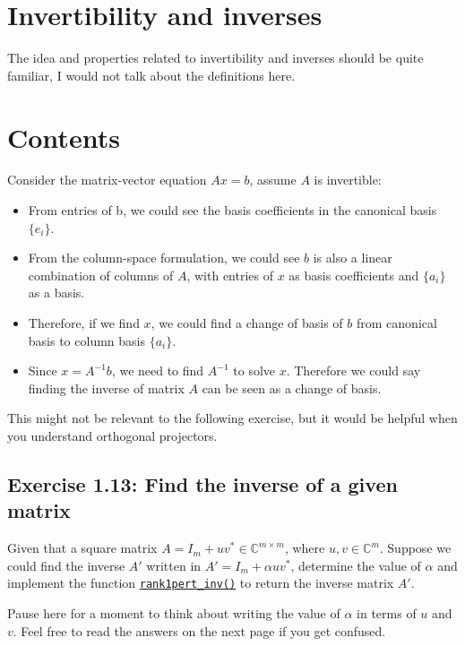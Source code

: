 \section{Invertibility and inverses}%
\label{sec1.6}
The idea and properties related to invertibility and inverses should be quite familiar, I would not talk about the definitions here. 
\section*{Contents}
Consider the matrix-vector equation \(Ax = b\), assume \(A\) is invertible:
\begin{itemize}
  \item From entries of b, we could see the basis coefficients in the canonical basis $\{e_i\}$. 
  \item From the column-space formulation, we could see \(b\) is also a linear combination of columns of \(A\), with entries of \(x\) as basis coefficients and \(\{a_i\}\)  as a basis. 
  \item Therefore, if we find \(x\), we could find a change of basis of \(b\)  from canonical basis to column basis \(\{a_i\}\).
  \item Since \(x = A^{-1}b\), we need to find \(A^{-1}\) to solve \(x\). Therefore we could say finding the inverse of matrix \(A\) can be seen as a change of basis.
\end{itemize}
This might not be relevant to the following exercise, but it would be helpful when you understand orthogonal projectors. \checked
\subsection*{Exercise 1.13: Find the inverse of a given matrix}%
\begin{problem}
  Given that a square matrix $A = I_m + uv^{*} \in \mathbb{C}^{m \times m}$, where $u, v \in \mathbb{C}^{m}$. Suppose we could find the inverse $A'$ written in  $A' = I_m + \alpha uv^{*}$, determine the value of $\alpha$ and implement the function \href{https://comp-lin-alg.github.io/cla_utils.html#cla_utils.exercises1.rank1pert_inv}{\texttt{rank1pert\_inv()}} to return the inverse matrix $A'$. \medskip
\end{problem}

\noindent Pause here for a moment to think about writing the value of \(\alpha\) in terms of \(u\) and \(v\). Feel free to read the answers on the next page if you get confused.
\newpage
